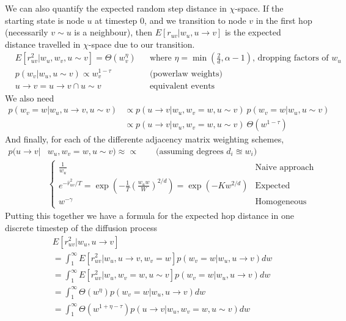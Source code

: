 We can also quantify the expected random step distance in $\chi$-space. If the starting state is node $u$ at timestep $0$, and we transition to node $v$ in the first hop (necessarily $v \sim u$ is a neighbour), then $E[r_{uv} | w_u, u \to v]$ is the expected distance travelled in $\chi$-space due to our transition.
\begin{align*}
  &E[r_{uv}^2 | w_u, w_v, u \sim v] = \Theta(w_v^\eta)
  && \text{where $\eta = \min(\frac{2}{d}, \alpha - 1)$, dropping factors of $w_u$}
  \\
  &p(w_v | w_u, u \sim v) \propto w_v^{1 - \tau}
  &&\text{(powerlaw weights)}
  \\
  & u \to v = u \to v \cap u \sim v && \text{equivalent events}
\end{align*}
We also need
\begin{align*}
  p(w_v = w | w_u, u \to v, u \sim v) 
  &\propto p(u \to v | w_u, w_v=w, u \sim v) \: p(w_v = w | w_u, u \sim v)
  \\
  & \propto p(u \to v | w_u, w_v=w, u \sim v)\: \Theta(w^{1 - \tau})
\end{align*}
And finally, for each of the differente adjacency matrix weighting schemes,
\begin{align*}
  p(u \to v | & w_u, w_v=w, u \sim v) \approx \propto \quad\quad \text{(assuming degrees $d_i \approxeq w_i$)}
  \\ & \begin{cases}
    \frac{1}{w_u} & \text{Naive approach}
    \\
    e^{-\hat{r}_{uv}^2/T} = \exp(-\frac{1}{T} (\frac{w_u w}{W})^{2/d}) = \exp(-K w^{2/d})
    & \text{Expected distance}
    \\
    w^{-\gamma} & \text{Homogeneous}
  \end{cases}
\end{align*}
Putting this together we have a formula for the expected hop distance in one discrete timestep of the diffusion process
\begin{align*}
  &E[r_{uv}^2 | w_u, u \to v]
  \\ 
  &= \int_1^\infty E[r_{uv}^2 | w_u, u \to v, w_v=w] p(w_v = w | w_u, u \to v) dw
  \\
  &= \int_1^\infty E[r_{uv}^2 | w_u, w_v =w, u \sim v] p(w_v = w | w_u, u \to v) dw
  \\
  &= \int_1^\infty \Theta(w^{\eta}) p(w_v = w | w_u, u \to v) dw
  \\
  &= \int_1^\infty \Theta(w^{1 + \eta - \tau}) p(u \to v | w_u, w_v=w, u \sim v) dw
\end{align*}
